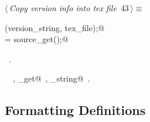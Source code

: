 \documentclass[a4paper]{report}
\begin{document}
\begin{flushleft}
\begin{minipage}{\linewidth}
\begin{list}{}{\setlength{\itemsep}{-\parsep}\setlength{\itemindent}{-\leftmargin}}
\item{}
\end{list}
\end{minipage}\vspace{4ex}
\end{flushleft}
\begin{flushleft} \small
\begin{minipage}{\linewidth}\label{scrap79}\raggedright\small
{} $\langle\,${\it Copy version info into tex file}\nobreak\ {\footnotesize {43}}$\,\rangle\equiv$
\vspace{-1ex}
\begin{list}{}{} \item
\mbox{}\verb@fputs(version_string, tex_file);@\\
\mbox{}\verb@c = source_get();@\\
\mbox{}\verb@@{\NWsep}
\end{list}
\vspace{-1.5ex}
\footnotesize
\begin{list}{}{\setlength{\itemsep}{-\parsep}\setlength{\itemindent}{-\leftmargin}}
\item \NWtxtMacroRefIn\ .
\item \NWtxtIdentsUsed\nobreak\  \verb@fputs@\nobreak\ , \verb@source_get@\nobreak\ , \verb@version_string@\nobreak\ .
\item{}
\end{list}
\end{minipage}\vspace{4ex}
\end{flushleft}
\subsection{Formatting Definitions}
\end{document}

